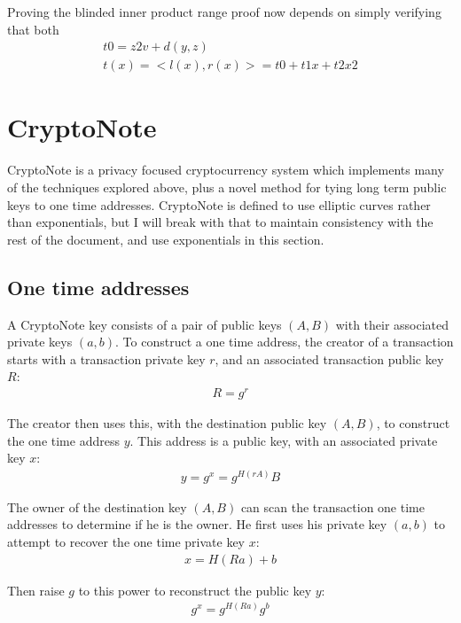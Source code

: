 \documentclass{article}
\begin{document}
Proving the blinded inner product range proof now depends on simply verifying that both 
\begin{eqnarray}
  t0 = z2 v + d(y,z)\\
  t(x) = <l(x), r(x)> = t0 + t1 x + t2 x2
\end{eqnarray}



\section{CryptoNote}

CryptoNote is a privacy focused cryptocurrency system which implements many of the techniques explored above, plus a novel method for tying long term public keys to one time addresses.  CryptoNote is defined to use elliptic curves rather than exponentials, but I will break with that to maintain consistency with the rest of the document, and use exponentials in this section.


\subsection{One time addresses}

A CryptoNote key consists of a pair of public keys $(A, B)$ with their associated private keys $(a, b)$.  To construct a one time address, the creator of a transaction starts with a transaction private key $r$, and an associated transaction public key $R$:
\begin{eqnarray}
  R=g^r
\end{eqnarray}

The creator then uses this, with the destination public key $(A, B)$, to construct the one time address $y$.  This address is a public key, with an associated private key $x$:
\begin{eqnarray}
  y = g^x = g^{H(rA)} B
\end{eqnarray}

The owner of the destination key $(A, B)$ can scan the transaction one time addresses to determine if he is the owner.  He first uses his private key $(a, b)$ to attempt to recover the one time private key $x$:
\begin{eqnarray}
	x = H(Ra) + b
\end{eqnarray}

Then raise $g$ to this power to reconstruct the public key $y$:
\begin{eqnarray}
  g^x = g^{H(Ra)} g^b
\end{eqnarray}
\end{document}
